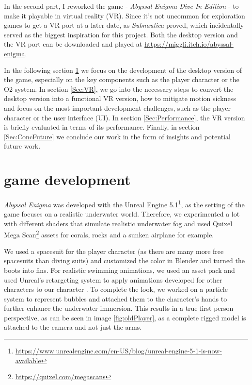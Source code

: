 \documentclass[letterpaper, 10 pt, conference]{ieeeconf}  %
\begin{document}
In the second part, I  reworked the game - \textit{Abyssal Enigma Dive In Edition} - to make it playable in virtual reality (VR).
Since it's not uncommon for exploration games to get a VR port at a later date, as \textit{Subnautica} \cite{Subnautica} proved, 
which incidentally served as the biggest inspiration for this project.
Both the desktop version and the VR port can be downloaded and played at
\url{https://miggli.itch.io/abyssal-enigma}.

In the following section \ref{Sec:Game} we focus on the development of the desktop version of the game, 
especially on the key components such as the player character or the O2 system.
In section \ref{Sec:VR}, we go into the necessary steps to convert the desktop version into a functional VR version,
how to mitigate motion sickness 
and focus on the most important development challenges, such as the player character or the user interface (UI).
In section \ref{Sec:Performance}, the VR version is briefly evaluated in terms of its performance.
Finally, in section \ref{Sec:ConcFuture} we conclude our work in the form of insights and potential future work.

\section{game development}
\label{Sec:Game}
\textit{Abyssal Enigma} was developed with the Unreal Engine 5.1\footnote{\url{https://www.unrealengine.com/en-US/blog/unreal-engine-5-1-is-now-available}},
as the setting of the game focuses on a realistic underwater world.
Therefore, we experimented a lot with different shaders that simulate realistic underwater fog 
and used Quixel Mega Scan\footnote{\url{https://quixel.com/megascans}} assets for corals, rocks and a sunken airplane for example.

We used a spacesuit for the player character (as there are many more free spacesuits than diving suits) 
and customized the color in Blender and turned the boots into fins.
For realistic swimming animations, we used an asset pack and used Unreal's retargeting system to apply animations developed for other characters to our character \cite{retarget}.
To complete the look, we worked on a particle system to represent bubbles and attached them to the character's hands to further enhance the underwater immersion.
This results in a true first-person perspective, as can be seen in image \ref{fig:oldPlayer}, as a complete rigged model is attached to the camera and not just the arms.
\end{document}
